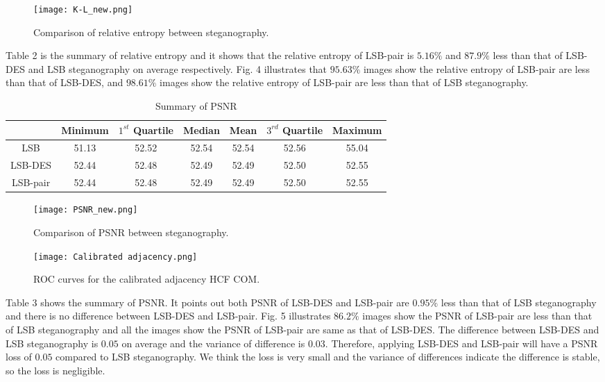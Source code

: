 \documentclass[a4paper,10pt,twocolumn]{article}
\begin{document}
\begin{figure}
 \texttt{[image: K-L\_new.png]}
 \caption{Comparison of relative entropy between steganography.}
\end{figure}

Table 2 is the summary of relative entropy and it shows that the relative entropy of LSB-pair
is $5.16\%$ and $87.9\%$ less than that of LSB-DES and LSB steganography on average respectively.
Fig. 4 illustrates that $95.63\%$ images show the relative entropy of LSB-pair are less than that of
LSB-DES, and $98.61\%$ images show the relative entropy of LSB-pair are less than that of LSB steganography.

\begin{table*}
\begin{tabular}{|c|c|c|c|c|c|c|}
\hline
 & Minimum & $1^{st}$ Quartile & Median & Mean & $3^{rd}$ Quartile & Maximum \\
\hline
LSB & 51.13 & 52.52 & 52.54 & 52.54 & 52.56 & 55.04 \\
LSB-DES & 52.44 & 52.48 & 52.49 & 52.49 &52.50 & 52.55 \\
LSB-pair & 52.44 & 52.48 & 52.49 & 52.49 & 52.50 & 52.55 \\
\hline
 \end{tabular}
 \caption{Summary of PSNR}
\end{table*}

\begin{figure}
 \texttt{[image: PSNR\_new.png]}
 \caption{Comparison of PSNR between steganography.}
\end{figure}

\begin{figure*}[h]
\centering
 \texttt{[image: Calibrated adjacency.png]}
 \caption{ROC curves for the calibrated adjacency HCF COM.}
\end{figure*}

Table 3 shows the summary of PSNR. It points out both PSNR of LSB-DES and LSB-pair are $0.95\%$ less
than that of LSB steganography and there is no difference between LSB-DES and LSB-pair. Fig. 5
illustrates $86.2\%$ images show the PSNR of LSB-pair are less than that of LSB steganography and
all the images show the PSNR of LSB-pair are same as that of LSB-DES.
The difference between LSB-DES and LSB steganography is $0.05$ on average and the variance of
difference is $0.03$. Therefore, applying LSB-DES and LSB-pair will have a PSNR loss of $0.05$
compared to LSB steganography. We think the loss is very small and the variance of differences
indicate the difference is stable, so the loss is negligible.
\end{document}
